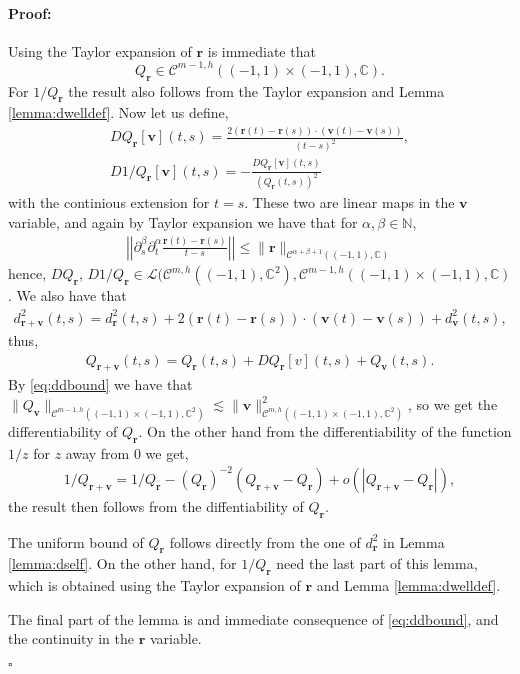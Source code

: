 \documentclass{article}
\newenvironment{proof}{\paragraph{Proof:}}{\hfill$\square$}
\newcommand{\IC}{{\mathbb C}}
\newcommand{\IN}{{\mathbb N}}
\newcommand{\cmspace}[3]{\mathcal{C}^{#1} \left( #2, #3 \right)}
\newcommand{\cmspaceh}[4]{\mathcal{C}^{#1,#2} \left( #3, #4 \right)}
\newcommand{\bh}{\bm{h}}
\newcommand{\bv}{\bm{v}}
\newcommand{\br}{\bm{r}}
\newcommand{\iinterv}{(-1,1)\times(-1,1)}
\begin{document}
\begin{proof}
Using the Taylor expansion of $\br$  is immediate that  $$Q_{\br} \in \cmspaceh{m-1}{h}{(-1,1)\times(-1,1)}{\IC}.$$ For $1/Q_{\br}$ the result also follows from the Taylor expansion and Lemma \ref{lemma:dwelldef}.  Now let us define,
\begin{align*}
DQ_{\br}[\bv](t,s) = \frac{2 (\br(t)-\br(s))\cdot (\bv(t)-\bv(s))}{(t-s)^2}, \\
D1/Q_{\br}[\bv](t,s) = -\frac{DQ_{\br}[\bv](t,s)}{(Q_{\br}(t,s))^2} 
\end{align*}
with the continious extension for $t=s$. These two are linear maps in the $\bv$ variable, and again by Taylor expansion we have that for $\alpha, \beta \in \IN$, 
\begin{align}
\label{eq:ddbound}
\left\vert \left\vert \partial_s^\beta \partial_t^\alpha \frac{\br(t)-\br(s)}{t-s} \right \vert  \right \vert\leq \| \br \|_{\cmspace{\alpha+\beta+1}{(-1,1)}{\IC}}
\end{align}
hence, $DQ_{\br}$, $D1/Q_{\br} \in \mathcal{L}(\cmspaceh{m}{h}{(-1,1)}{\IC^2}
  , \cmspaceh{m-1}{h}{(-1,1)\times(-1,1)}{\IC}$.
We also have that 
\begin{align*}
d_{\br +\bv}^2(t,s) = d^2_{\br}(t,s) + 2 (\br(t) -\br(s))\cdot (\bv(t)-\bv(s)) + d_{\bv}^2(t,s),
\end{align*}
thus, 
\begin{align*}
Q_{\br +\bv}(t,s) = Q_{\br}(t,s) + DQ_{\br}[v](t,s) + Q_{\bv}(t,s).
\end{align*}
By \eqref{eq:ddbound} we have that $\| Q_{\bv}\|_{\cmspaceh{m-1}{h}{\iinterv}{\IC^2}} \lesssim \| \bv\|_{\cmspaceh{m}{h}{\iinterv}{\IC^2}}^2$, so we get the differentiability of $Q_{\br}$. On the other hand from the differentiability of the function $1/z$ for $z$ away from $0$ we get, 
\begin{align*}
1/Q_{\br+\bv} = 1/Q_{\br} - (Q_{\br})^{-2} (Q_{\br+\bv}-Q_{\br}) + o(|Q_{\br+\bv}-Q_{\br}|),
\end{align*}
the result then follows from the diffentiability of $Q_{\br}$.



The uniform bound of $Q_{\br}$ follows directly from the one of $d^2_{\br}$ in Lemma \ref{lemma:dself}. On the other hand, for $1/Q_{\br}$ need the last part of this lemma, which is obtained using the Taylor expansion of $\br$ and Lemma \ref{lemma:dwelldef}.

The final part of the lemma is and immediate consequence of \eqref{eq:ddbound}, and the continuity in the $\br$ variable. 

\end{proof}
\end{document}
